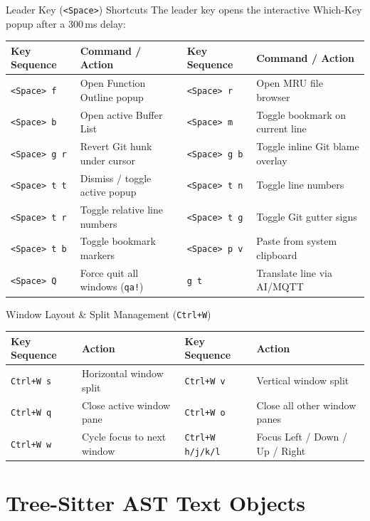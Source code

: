 \documentclass[11pt,a4paper,openany]{book}
\newcommand{\code}[1]{\colorbox{inlinebg}{\texttt{#1}}}
\begin{document}
\begin{keybox}{Leader Key (\code{<Space>}) Shortcuts}
The leader key opens the interactive Which-Key popup after a 300\,ms delay:
\begin{tabularx}{\textwidth}{l X l X}
\toprule
\textbf{Key Sequence} & \textbf{Command / Action} & \textbf{Key Sequence} & \textbf{Command / Action} \\
\midrule
\code{<Space> f} & Open Function Outline popup & \code{<Space> r} & Open MRU file browser \\
\code{<Space> b} & Open active Buffer List & \code{<Space> m} & Toggle bookmark on current line \\
\code{<Space> g r} & Revert Git hunk under cursor & \code{<Space> g b} & Toggle inline Git blame overlay \\
\code{<Space> t t} & Dismiss / toggle active popup & \code{<Space> t n} & Toggle line numbers \\
\code{<Space> t r} & Toggle relative line numbers & \code{<Space> t g} & Toggle Git gutter signs \\
\code{<Space> t b} & Toggle bookmark markers & \code{<Space> p v} & Paste from system clipboard \\
\code{<Space> Q} & Force quit all windows (\code{qa!}) & \code{g t} & Translate line via AI/MQTT \\
\bottomrule
\end{tabularx}
\end{keybox}

\begin{keybox}{Window Layout \& Split Management (\code{Ctrl+W})}
\begin{tabularx}{\textwidth}{l >{\RaggedRight}X l >{\RaggedRight}X}
\toprule
\textbf{Key Sequence} & \textbf{Action} & \textbf{Key Sequence} & \textbf{Action} \\
\midrule
\code{Ctrl+W s} & Horizontal window split & \code{Ctrl+W v} & Vertical window split \\
\code{Ctrl+W q} & Close active window pane & \code{Ctrl+W o} & Close all other window panes \\
\code{Ctrl+W w} & Cycle focus to next window & \code{Ctrl+W h/j/k/l} & Focus Left / Down / Up / Right \\
\bottomrule
\end{tabularx}
\end{keybox}

\chapter{Tree-Sitter AST Text Objects}
\end{document}
